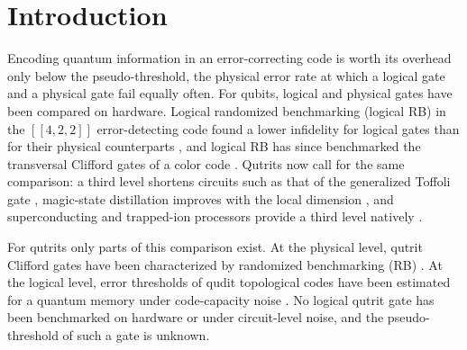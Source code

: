 \section{Introduction}\label{sec:intro}

Encoding quantum information in an error-correcting code is worth its overhead only below the pseudo-threshold, the physical error rate at which a logical gate and a physical gate fail equally often. For qubits, logical and physical gates have been compared on hardware. Logical randomized benchmarking (logical RB) in the $[[4,2,2]]$ error-detecting code found a lower infidelity for logical gates than for their physical counterparts \cite{Harper2019FTIBM}, and logical RB has since benchmarked the transversal Clifford gates of a color code \cite{Lacroix2025ColorCode}. Qutrits now call for the same comparison: a third level shortens circuits such as that of the generalized Toffoli gate \cite{Gokhale2019,Wang2020}, magic-state distillation improves with the local dimension \cite{CampbellPRX2012,CampbellPRL2014}, and superconducting and trapped-ion processors provide a third level natively \cite{Goss2024,Ringbauer2022}.

For qutrits only parts of this comparison exist. At the physical level, qutrit Clifford gates have been characterized by randomized benchmarking (RB) \cite{Morvan2021}. At the logical level, error thresholds of qudit topological codes have been estimated for a quantum memory under code-capacity noise \cite{DuclosCianci2013}. No logical qutrit gate has been benchmarked on hardware or under circuit-level noise, and the pseudo-threshold of such a gate is unknown.

